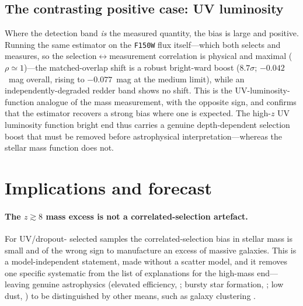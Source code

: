 \documentclass{aa}
\begin{document}
\subsection{The contrasting positive case: UV luminosity}
\label{sec:uv}

Where the detection band \emph{is} the measured quantity, the bias is large and positive. Running
the same estimator on the \texttt{F150W} flux itself---which both selects and measures, so the
selection$\leftrightarrow$measurement correlation is physical and maximal ($\rho\simeq1$)---the
matched-overlap shift is a robust bright-ward boost ($8.7\sigma$; $-0.042$~mag overall, rising to
$-0.077$~mag at the medium limit), while an independently-degraded redder band shows no shift.
This is the UV-luminosity-function analogue of the mass measurement, with the opposite sign, and
confirms that the estimator recovers a strong bias where one is expected. The high-$z$ UV
luminosity function bright end thus carries a genuine depth-dependent selection boost that must be
removed before astrophysical interpretation---whereas the stellar mass function does not.

\section{Implications and forecast}
\label{sec:implications}

\paragraph{The $z\gtrsim8$ mass excess is not a correlated-selection artefact.} For UV/dropout-
selected samples the correlated-selection bias in stellar mass is small and of the wrong sign to
manufacture an excess of massive galaxies. This is a model-independent statement, made without a
scatter model, and it removes one specific systematic from the list of explanations for the
high-mass end---leaving genuine astrophysics (elevated efficiency, \citealt{Dekel2023}; bursty star
formation, \citealt{Sun2023,Shen2023}; low dust, \citealt{Ferrara2023,Cullen2024}) to be
distinguished by other means, such as galaxy clustering \citep{Munoz2023}.
\end{document}
